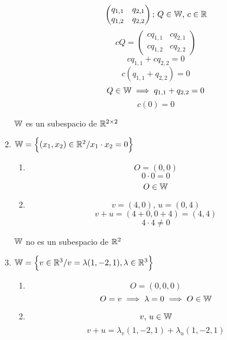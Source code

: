 \documentclass[../practica.root.tex]{subfiles}
\begin{document}
\begin{enumerate}
\begin{enumerate}
\begin{enumerate}
\[                                  \begin{pmatrix}
                                      q_{1,1} & q_{2,1} \\
                                      q_{1,2} & q_{2,2}
                                  \end{pmatrix}
                                  \text{; }
                                  Q \in \mathbb{W}
                                  \text{, }
                                  c \in \mathbb{R}
                              \]
                              \[
                                  cQ =
                                  \begin{pmatrix}
                                      cq_{1,1} & cq_{2,1} \\
                                      cq_{1,2} & cq_{2,2}
                                  \end{pmatrix}
                              \]
                              \[ cq_{1,1} + cq_{2,2} = 0 \]
                              \[ c(q_{1,1} + q_{2,2}) = 0 \]
                              \[ Q \in \mathbb{W} \implies q_{1,1} + q_{2,2} = 0 \]
                              \[ c(0) = 0 \]
                    \end{enumerate}
                    $\mathbb{W}$ es un subespacio de $\mathbb{R}^{2\times2}$
              \item $ \mathbb{W} = \Big\{ (x_1, x_2) \in \mathbb{R}^2 / x_1 \cdot x_2 = 0 \Big\} $
                    \begin{enumerate}
                        \item \[ O = (0,0) \]
                              \[ 0 \cdot 0 = 0 \]
                              \[ O \in \mathbb{W} \]
                        \item \[ v = (4,0)\text{, } u = (0,4) \]
                              \[ v + u = (4 + 0, 0 + 4) = (4,4) \]
                              \[ 4\cdot4 \neq 0 \]
                    \end{enumerate}
                    $\mathbb{W}$ no es un subespacio de $\mathbb{R}^2$
              \item $ \mathbb{W} = \Big\{ v \in \mathbb{R}^3 / v = \lambda(1,-2,1), \lambda \in \mathbb{R}^3 \Big\} $
                    \begin{enumerate}
                        \item \[ O = (0,0,0) \]
                              \[ O = v \implies \lambda = 0 \implies O \in \mathbb{W} \]
                        \item \[ v\text{, }u \in \mathbb{W} \]
                              \[ v + u = \lambda_v(1,-2,1) + \lambda_u(1,-2,1) \]

\end{enumerate}
\end{enumerate}
\end{enumerate}
\end{document}
